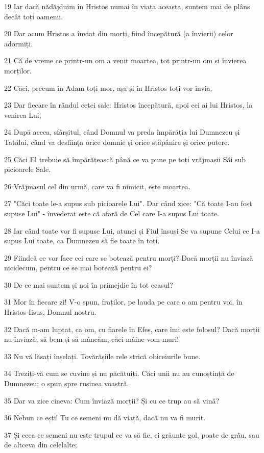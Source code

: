 \par 19 Iar dacă nădăjduim în Hristos numai în viața aceasta, suntem mai de plâns decât toți oamenii.
\par 20 Dar acum Hristos a înviat din morți, fiind începătură (a învierii) celor adormiți.
\par 21 Că de vreme ce printr-un om a venit moartea, tot printr-un om și învierea morților.
\par 22 Căci, precum în Adam toți mor, așa și în Hristos toți vor învia.
\par 23 Dar fiecare în rândul cetei sale: Hristos începătură, apoi cei ai lui Hristos, la venirea Lui,
\par 24 După aceea, sfârșitul, când Domnul va preda împărăția lui Dumnezeu și Tatălui, când va desființa orice domnie și orice stăpânire și orice putere.
\par 25 Căci El trebuie să împărățească până ce va pune pe toți vrăjmașii Săi sub picioarele Sale.
\par 26 Vrăjmașul cel din urmă, care va fi nimicit, este moartea.
\par 27 "Căci toate le-a supus sub picioarele Lui". Dar când zice: "Că toate I-au fost supuse Lui" - învederat este că afară de Cel care I-a supus Lui toate.
\par 28 Iar când toate vor fi supuse Lui, atunci și Fiul însuși Se va supune Celui ce I-a supus Lui toate, ca Dumnezeu să fie toate în toți.
\par 29 Fiindcă ce vor face cei care se botează pentru morți? Dacă morții nu înviază nicidecum, pentru ce se mai botează pentru ei?
\par 30 De ce mai suntem și noi în primejdie în tot ceasul?
\par 31 Mor în fiecare zi! V-o spun, fraților, pe lauda pe care o am pentru voi, în Hristos Iisus, Domnul nostru.
\par 32 Dacă m-am luptat, ca om, cu fiarele în Efes, care îmi este folosul? Dacă morții nu înviază, să bem și să mâncăm, căci mâine vom muri!
\par 33 Nu vă lăsați înșelați. Tovărășiile rele strică obiceiurile bune.
\par 34 Treziți-vă cum se cuvine și nu păcătuiți. Căci unii nu au cunoștință de Dumnezeu; o spun spre rușinea voastră.
\par 35 Dar va zice cineva: Cum înviază morții? Și cu ce trup au să vină?
\par 36 Nebun ce ești! Tu ce semeni nu dă viață, dacă nu va fi murit.
\par 37 Și ceea ce semeni nu este trupul ce va să fie, ci grăunte gol, poate de grâu, sau de altceva din celelalte;
